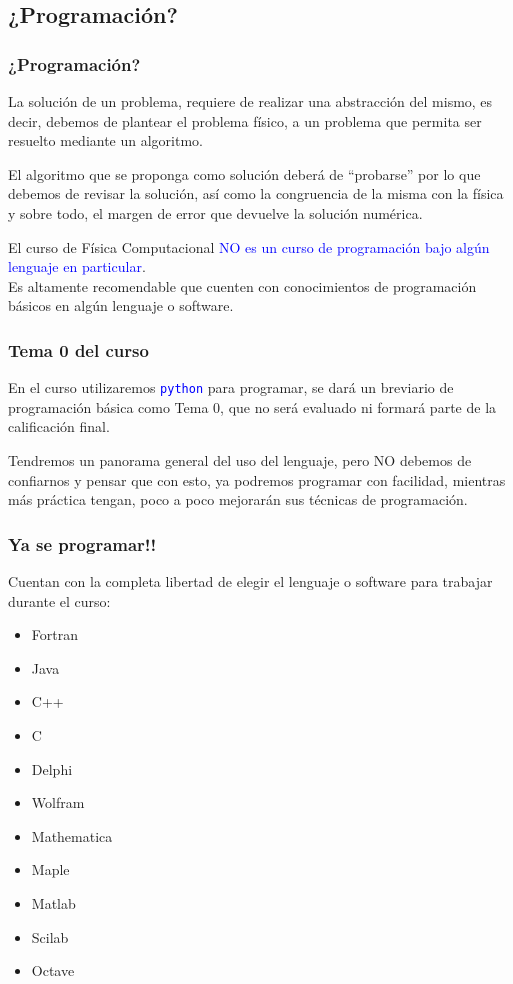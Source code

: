 \documentclass[12pt]{beamer}
\newcommand{\python}{\texttt{python}}
\newcommand{\textoazul}[1]{\textcolor{blue}{#1}}
\begin{document}
\subsection{¿Programación?}
\begin{frame}
\frametitle{¿Programación?}
La solución de un problema, requiere de realizar una abstracción del mismo, es decir, debemos de plantear el problema físico, a un problema que permita ser resuelto mediante un algoritmo.
\end{frame}
\begin{frame}
El algoritmo que se proponga como solución deberá de \enquote{probarse} por lo que debemos de revisar la solución, así como la congruencia de la misma con la física y sobre todo, el margen de error que devuelve la solución numérica.
\end{frame}
\begin{frame}
El curso de Física Computacional \textoazul{NO es un curso de programación bajo algún lenguaje en particular}.
\\
\bigskip
Es altamente recomendable que cuenten con conocimientos de programación básicos en algún lenguaje o software.
\end{frame}
\begin{frame}
\frametitle{Tema 0 del curso}
En el curso utilizaremos \textoazul{\python} para programar, se dará un breviario de programación básica como Tema 0, que no será evaluado ni formará parte de la calificación final.
\end{frame}
\begin{frame}
Tendremos un panorama general del uso del lenguaje, pero NO debemos de confiarnos y pensar que con esto, ya podremos programar con facilidad, mientras más práctica tengan, poco a poco mejorarán sus técnicas de programación.
\end{frame}
\begin{frame}
\frametitle{Ya se programar!!}
Cuentan con la completa libertad de elegir el lenguaje o software para trabajar durante el curso:
\begin{multicols}{2}
\begin{itemize}
\item Fortran
\item Java
\item C++
\item C
\item Delphi
\item Wolfram
\item Mathematica
\item Maple
\item Matlab
\item Scilab
\item Octave
\end{itemize}
\end{multicols}
\end{frame}
\end{document}
